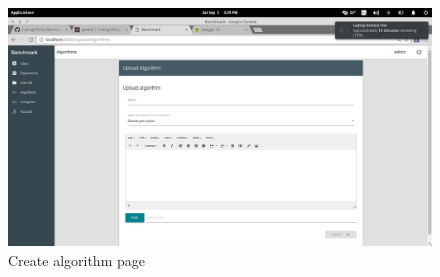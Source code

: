 \documentclass[11pt,a4paper]{article}
\begin{document}
\begin{figure}[H]
	\begin{center}
		\includegraphics[scale=0.3]{../Images/User Manual/Upload Algorithm.png}
		\caption{Create algorithm page}
		\label{fig:createAlg}
	\end{center}  
\end{figure}
\end{document}
